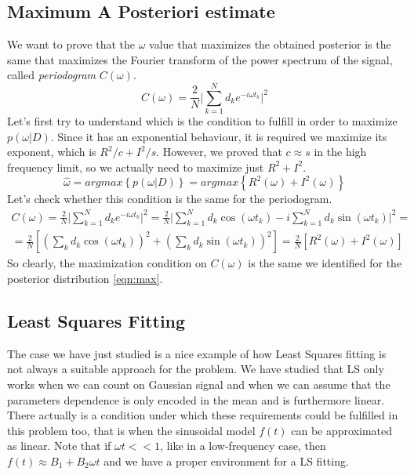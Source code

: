 \documentclass[a4paper,11pt,fleqn]{article}
\begin{document}
\subsection{Maximum A Posteriori estimate}
We want to prove that the $\omega$ value that maximizes the obtained 
posterior is the same that maximizes the Fourier transform of the power 
spectrum of the signal, called \textit{periodogram} $C(\omega)$.
\begin{equation}
    C(\omega) = \frac{2}{N} \Big| \sum_{k=1}^N d_k e^{-i\omega t_k}\Big|^2
\end{equation}
Let's first try to understand which is the condition to fulfill in order 
to maximize $p(\omega|D)$. Since it has an exponential behaviour, it is 
required we maximize its exponent, which is $R^2/c + I^2/s$. However,
we proved that $c\approx s$ in the high frequency limit, so we actually 
need to maximize just $R^2+I^2$.
\begin{equation}
    \label{eqn:max}
    \hat{\omega} = argmax\left\{p(\omega|D)\right\} = argmax\left\{R^2(\omega)+I^2(\omega)\right\}
\end{equation}
Let's check whether this condition is the same for the periodogram. 
\begin{gather*}
    C(\omega) = \frac{2}{N} \Big| \sum_{k=1}^N d_k e^{-i\omega t_k}\Big|^2 = \frac{2}{N} \Big| \sum_{k=1}^N d_k \cos(\omega t_k) -i \sum_{k=1}^N d_k \sin(\omega t_k) \Big|^2 = \\
    = \frac{2}{N} \left[\left(\sum_k d_k \cos(\omega t_k)\right)^2 + \left(\sum_k d_k \sin(\omega t_k)\right)^2\right] = \frac{2}{N}\left[R^2(\omega)+I^2(\omega)\right] 
\end{gather*}
So clearly, the maximization condition on $C(\omega)$ is the same we identified 
for the posterior distribution \ref{eqn:max}.

\subsection{Least Squares Fitting}
The case we have just studied is a nice example of how Least Squares fitting 
is not always a suitable approach for the problem. We have studied that LS 
only works when we can count on Gaussian signal and when we can assume 
that the parameters dependence is only encoded in the mean and is furthermore 
linear.
There actually is a condition under which these requirements could be fulfilled 
in this problem too, that is when the sinusoidal model $f(t)$ can be 
approximated as linear. Note that if $\omega t << 1$, like in a low-frequency 
case, then $f(t) \approx B_1 + B_2\omega t$ and we have a proper environment 
for a LS fitting.
\end{document}
